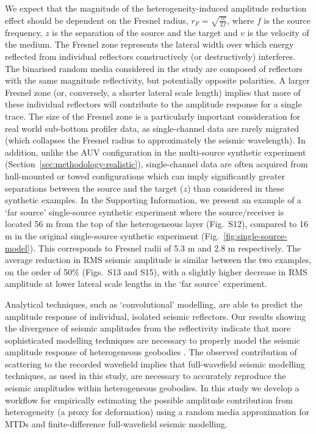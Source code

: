 \documentclass[se,manuscript]{copernicus}
\begin{document}
We expect that the magnitude of the heterogeneity-induced amplitude reduction effect should be dependent on the Fresnel radius, $r_F=\sqrt{\frac{z v}{2 f}}$, where $f$ is the source frequency, $z$ is the separation of the source and the target and $v$ is the velocity of the medium.
The Fresnel zone represents the lateral width over which energy reflected from individual reflectors constructively (or destructively) interferes.
The binarised random media considered in the study are composed of reflectors with the same magnitude reflectivity, but potentially opposite polarities.
A larger Fresnel zone (or, conversely, a shorter lateral scale length) implies that more of these individual reflectors will contribute to the amplitude response for a single trace.
The size of the Fresnel zone is a particularly important consideration for real world sub-bottom profiler data, as single-channel data are rarely migrated (which collapses the Fresnel radius to approximately the seismic wavelength).
In addition, unlike the AUV configuration in the multi-source synthetic experiment (Section~\ref{sec:methodology-realistic}), single-channel data are often acquired from hull-mounted or towed configurations which can imply significantly greater separations between the source and the target ($z$) than considered in these synthetic examples.
In the Supporting Information, we present an example of a `far source' single-source synthetic experiment where the source/receiver is located 56 \unit{m} from the top of the heterogeneous layer (Fig.~S12), compared to 16 \unit{m} in the original single-source synthetic experiment (Fig.~\ref{fig:single-source-model}).
This corresponds to Fresnel radii of 5.3 \unit{m} and 2.8 \unit{m} respectively.
The average reduction in RMS seismic amplitude is similar between the two examples, on the order of 50\% (Figs.~S13 and S15), with a slightly higher decrease in RMS amplitude at lower lateral scale lengths in the `far source' experiment.

Analytical techniques, such as `convolutional' modelling, are able to predict the amplitude response of individual, isolated seismic reflectors.
Our results showing the divergence of seismic amplitudes from the reflectivity indicate that more sophisticated modelling techniques are necessary to properly model the seismic amplitude response of heterogeneous geobodies \citep[as shown in, e.g.,][]{carcione_numerical_2016}.
The observed contribution of scattering to the recorded wavefield implies that full-wavefield seismic modelling techniques, as used in this study, are necessary to accurately reproduce the seismic amplitudes within heterogeneous geobodies.
In this study we develop a workflow for empirically estimating the possible amplitude contribution from heterogeneity (a proxy for deformation) using a random media approximation for MTDs and finite-difference full-wavefield seismic modelling.
\end{document}

